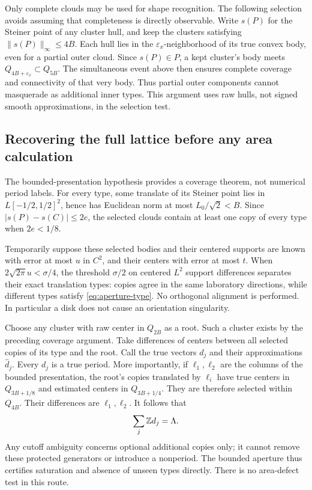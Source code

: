 Only complete clouds may be used for shape recognition. The following
selection avoids assuming that completeness is directly observable.
Write $s(P)$ for the Steiner point of any cluster hull, and keep the
clusters satisfying $\|s(P)\|_\infty\le4B$. Each hull lies in the
$\varepsilon_x$-neighborhood of its true convex body, even for a partial
outer cloud. Since $s(P)\in P$, a kept cluster's body meets
$Q_{4B+\varepsilon_x}\subset Q_{5B}$. The simultaneous event above then
ensures complete coverage and connectivity of that very body. Thus
partial outer components cannot masquerade as additional inner types.
This argument uses raw hulls, not signed smooth approximations, in the
selection test.

\subsection{Recovering the full lattice before any area calculation}
The bounded-presentation hypothesis provides a coverage theorem, not
numerical period labels. For every type, some translate of its Steiner
point lies in $L[-1/2,1/2]^2$, hence has Euclidean norm at most
$L_0/\sqrt2<B$. Since $|s(P)-s(C)|\le2e$, the selected clouds contain
at least one copy of every type when $2e<1/8$.

Temporarily suppose these selected bodies and their centered supports
are known with error at most $u$ in $C^2$, and their centers with error
at most $t$. When $2\sqrt{2\pi}u<\sigma/4$, the threshold $\sigma/2$
on centered $L^2$ support differences separates their exact translation
types: copies agree in the same laboratory directions, while different
types satisfy \eqref{eq:aperture-type}. No orthogonal alignment is
performed. In particular a disk does not cause an orientation singularity.

Choose any cluster with raw center in $Q_{2B}$ as a root. Such a cluster
exists by the preceding coverage argument. Take differences of centers
between all selected copies of its type and the root. Call the true
vectors $d_j$ and their approximations $\widehat d_j$. Every $d_j$ is
a true period. More importantly, if $\ell_1,\ell_2$ are the columns of
the bounded presentation, the root's copies translated by $\ell_i$ have
true centers in $Q_{3B+1/8}$ and estimated centers in $Q_{3B+1/4}$.
They are therefore selected within $Q_{4B}$. Their differences are
$\ell_1,\ell_2$. It follows that
\begin{equation}\label{eq:aperture-generation}
                         \sum_j\mathbb Z d_j=\Lambda.
\end{equation}
Any cutoff ambiguity concerns optional additional copies only; it cannot
remove these protected generators or introduce a nonperiod. The bounded
aperture thus certifies saturation and absence of unseen types directly.
There is no area-defect test in this route.

